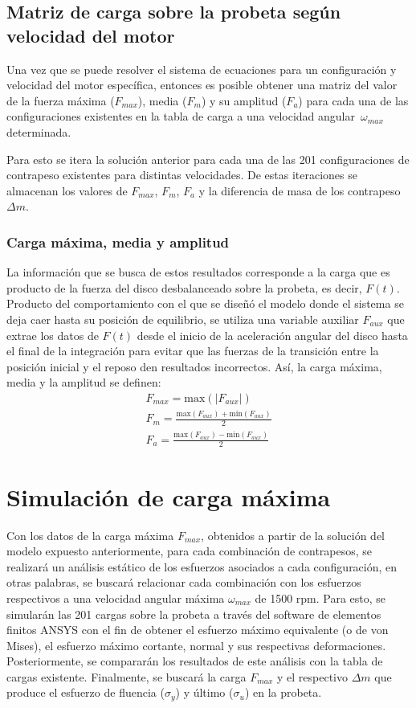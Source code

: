 \subsection{Matriz de carga sobre la probeta según velocidad del motor}
Una vez que se puede resolver el sistema de ecuaciones para un configuración y velocidad del motor específica, entonces es posible obtener una matriz del valor de la fuerza máxima ($F_{max}$), media ($F_m$) y su amplitud ($F_a$) para cada una de las configuraciones existentes en la tabla de carga a una velocidad angular $\,\omega_{max}\,$ determinada.

Para esto se itera la solución anterior para cada una de las 201 configuraciones de contrapeso existentes para distintas velocidades. De estas iteraciones se almacenan los valores de $F_{max}$, $F_m$, $F_a$ y la diferencia de masa de los contrapeso $\Delta m$. 

\subsubsection{Carga máxima, media y amplitud}
La información que se busca de estos resultados corresponde a la carga que es producto de la fuerza del disco desbalanceado sobre la probeta, es decir, $F(t)$. Producto del comportamiento con el que se diseñó el modelo donde el sistema se deja caer hasta su posición de equilibrio,  se utiliza una variable auxiliar $F_{aux}$ que extrae los datos de $F(t)$ desde el inicio de la aceleración angular del disco hasta el final de la integración para evitar que las fuerzas de la transición entre la posición inicial y el reposo den resultados incorrectos. Así, la carga máxima, media y la amplitud se definen:
\begin{gather} 
	F_{max} = \text{max}(|F_{aux}|) \label{eq:f_max}\\
	F_m = \frac{\text{max}(F_{aux}) + \text{min}(F_{aux})}{2} \label{eq:f_m}\\
	F_a = \frac{\text{max}(F_{aux}) - \text{min}(F_{aux})}{2} \label{eq:f_a}
\end{gather}

\newpage

\section{Simulación de carga máxima}
\label{sec:sim_probeta}
Con los datos de la carga máxima $F_{max}$, obtenidos a partir de la solución del modelo expuesto anteriormente, para cada combinación de contrapesos, se realizará un análisis estático de los esfuerzos asociados a cada configuración, en otras palabras, se buscará relacionar cada combinación con los esfuerzos respectivos a una velocidad angular máxima $\omega_{max}$ de 1500 rpm. Para esto, se simularán las 201 cargas sobre la probeta a través del software de elementos finitos ANSYS con el fin de obtener el esfuerzo máximo equivalente (o de von Mises), el esfuerzo máximo cortante, normal y sus respectivas deformaciones. Posteriormente, se compararán los resultados de este análisis con la tabla de cargas existente. Finalmente, se buscará la carga $F_{max}$ y el respectivo $\Delta m$ que produce el esfuerzo de fluencia ($\sigma_y$) y último ($\sigma_u$) en la probeta. 

